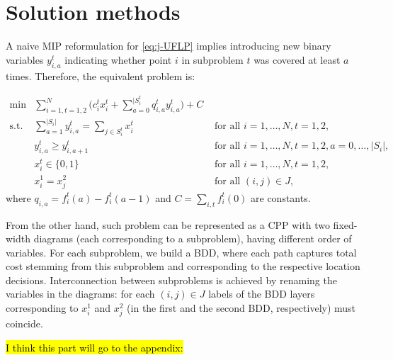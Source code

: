 \documentclass[11pt]{article}
\begin{document}
\section{Solution methods}
\label{sec:org7feacdf}
A naive MIP reformulation for \eqref{eq:j-UFLP} implies introducing new binary
variables \(y_{i,a}^t\) indicating whether point \(i\) in subproblem \(t\) was covered
at least \(a\) times. Therefore, the equivalent problem is:

\begin{subequations}\label{eq:j-UFLP-MIP}
\begin{align}\tag{j-UFLP-MIP}
  \min & \sum_{i=1, t=1,2}^N \Big(c^t_i x^t_i + \sum_{a=0}^{|S_i^t}q_{i,a}^t y^t_{i,a}\Big)+C&\\
    \textrm{s.t. } & \sum_{a=1}^{|S_i|} y_{i,a}^t = \sum_{j\in S^t_i} x^t_i& \textrm{ for all } i=1,\ldots, N, t=1,2,\\
    & y^t_{i,a} \geq y^t_{i, a+1} & \textrm{ for all }i=1, \ldots, N, t=1,2, a=0,\ldots,|S_i|,\\
    & x^t_i\in\{0,1\} & \textrm{ for all } i=1,\ldots,N, t=1,2,\\
    & x^1_i = x^2_j & \textrm{ for all } (i, j)\in J,\label{eq:link}
\end{align}
\end{subequations}
where \(q_{i,a}=f_i^t(a)-f_i^t(a-1)\) and \(C=\sum_{i,t} f_i^t(0)\) are constants.

From the other hand, such problem can be represented as a CPP with two
fixed-width diagrams (each corresponding to a subproblem), having different
order of variables. For each subproblem, we build a BDD, where each path
captures total cost stemming from this subproblem and corresponding to the
respective location decisions. Interconnection between subproblems is achieved
by renaming the variables in the diagrams: for each \((i, j)\in J\) labels of the
BDD layers corresponding to \(x_i^1\) and \(x_j^2\) (in the first and the second
BDD, respectively) must coincide.

\hl{I think this part will go to the appendix:}
\end{document}
